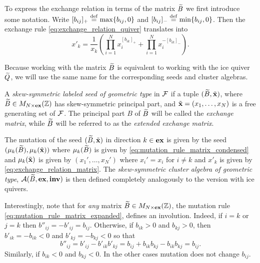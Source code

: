 To express the exchange relation in terms of the matrix $\widetilde{B}$ we first introduce some
notation. Write $[b_{ij}]_{+} \overset{\mathrm{def}}{=} \max\{b_{ij}, 0\}$ and $[b_{ij}]_{-} \overset{\mathrm{def}}{=}
	\min\{b_{ij}, 0\}$. Then the exchange rule \cref{eq:exchange_relation_quiver}
translates into
\begin{equation}\label{eq:exchange_relation_matrix}
	x'_k = \frac{1}{x_k}\left(\prod_{i=1}^N x_i^{[b_{ik}]_{+}} + \prod_{i=1}^{N} x_i^{-[b_{ik}]_{-}}\right).
\end{equation}

Because working with the matrix $\widetilde{B}$ is equivalent to working with the ice quiver
$\widetilde{Q}$, we will use the same name for the corresponding seeds and cluster algebras.
\begin{definition}

	A \emph{skew-symmetric labeled seed of geometric type} in $\mathcal{F}$ if a tuple $(\widetilde{B}, \tilde{\mathbf{x}})$, where $\widetilde{B} \in M_{N \times
				\mathbf{ex}}(\mathbb{Z})$ has skew-symmetric principal part, and $\tilde{\mathbf{x}} = (x_1, \dots, x_N)$ is a free
	generating set of $\mathcal{F}$. The principal part $B$ of $\widetilde{B}$ will be called the
	\emph{exchange matrix}, while $\widetilde{B}$ will be referred to as the
	\emph{extended exchange matrix}.

	The mutation of the seed $(\widetilde{B}, \tilde{\mathbf{x}})$ in direction $k \in \mathbf{ex}$ is given by the seed
	$(\mu_k(\widetilde{B}), \mu_k(\tilde{\mathbf{x}}))$ where $\mu_k(\widetilde{B})$ is given by
	\cref{eq:mutation_rule_matrix_condensed} and $\mu_k(\tilde{\mathbf{x}})$ is given by $(x_1', \dots,
		x_N')$ where $x_i' = x_i$ for $i\neq k$ and $x'_k$ is given by
	\cref{eq:exchange_relation_matrix}. The \emph{skew-symmetric cluster algebra of
		geometric type}, $\mathcal{A}(\widetilde{B},
		\mathbf{ex}, \mathbf{inv})$ is then defined completely
	analogously to the version with ice quivers.
\end{definition}

Interestingly, note that for \emph{any} matrix $\widetilde{B} \in M_{N\times \mathbf{ex}}(\mathbb{Z})$, the
mutation rule \cref{eq:mutation_rule_matrix_expanded}, defines an involution. Indeed,
if $i = k$ or $j = k$ then $b''_{ij} = -b'_{ij} = b_{ij}$. Otherwise, if $b_{ik} > 0$
and $b_{kj} >0$, then $b'_{ik} = -b_{ik} < 0$ and $b'_{kj} = -b_{kj} < 0$ so that
\begin{equation*}
	b''_{ij} = b'_{ij} - b'_{ik}b'_{kj} = b_{ij} + b_{ik}b_{kj} - b_{ik}b_{kj} = b_{ij}.
\end{equation*}
%
Similarly, if $b_{ik} < 0$ and $b_{kj} < 0$. In the other cases mutation does not
change $b_{ij}$.

